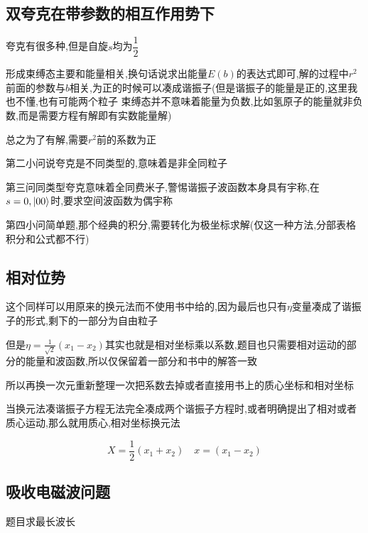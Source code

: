 \documentclass{article}
\begin{document}
        \subsection{双夸克在带参数的相互作用势下}
            \begin{formal}
                夸克有很多种,但是自旋$s$均为$\dfrac{1}{2}$
            \end{formal}

            形成束缚态主要和能量相关,换句话说求出能量$E(b)$的表达式即可,解的过程中$r^{2}$前面的参数与$b$相关,为正的时候可以凑成谐振子(但是谐振子的能量是正的,这里我也不懂,也有可能两个粒子
            束缚态并不意味着能量为负数,比如氢原子的能量就非负数,而是需要方程有解即有实数能量解)
            
            总之为了有解,需要$r^{2}$前的系数为正

            第二小问说夸克是不同类型的,意味着是非全同粒子

            第三问同类型夸克意味着全同费米子,警惕谐振子波函数本身具有宇称,在$s=0,\ket{00}$时,要求空间波函数为偶宇称

            第四小问简单题,那个经典的积分,需要转化为极坐标求解(仅这一种方法,分部表格积分和公式都不行)

        \subsection{相对位势}
            这个同样可以用原来的换元法而不使用书中给的,因为最后也只有$\eta$变量凑成了谐振子的形式,剩下的一部分为自由粒子

            但是$\eta = \frac{1}{\sqrt{2}}(x_{1} - x_{2})$其实也就是相对坐标乘以系数,题目也只需要相对运动的部分的能量和波函数,所以仅保留着一部分和书中的解答一致

            所以再换一次元重新整理一次把系数去掉或者直接用书上的质心坐标和相对坐标

            \begin{formal}
                当换元法凑谐振子方程无法完全凑成两个谐振子方程时,或者明确提出了相对或者质心运动,那么就用质心,相对坐标换元法

                $$
                X = \frac{1}{2}(x_{1}+x_{2}) \quad x = (x_{1} - x_{2})
                $$

            \end{formal}

        \subsection{吸收电磁波问题}
            题目求最长波长
\end{document}
